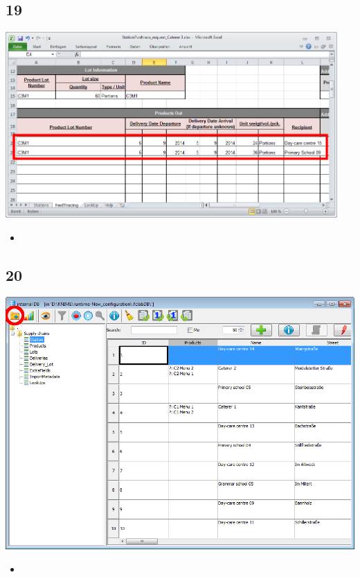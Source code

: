 \documentclass{beamer}
\begin{document}
\subsection{19}
\begin{frame}
	\begin{center}
  		\includegraphics[width=0.95\textwidth]{19.png}
	\end{center}
	\begin{itemize}
		\item
	\end{itemize}
\end{frame}

\subsection{20}
\begin{frame}
	\begin{center}
  		\includegraphics[height=0.6\textheight]{20.png}
	\end{center}
	\begin{itemize}
		\item
	\end{itemize}
\end{frame}
\end{document}
